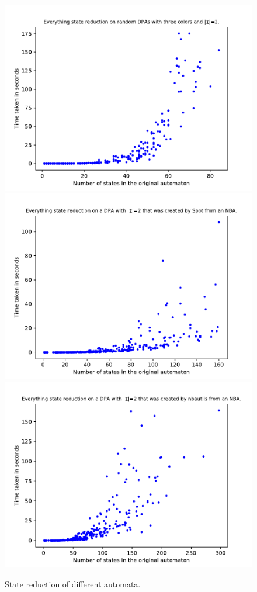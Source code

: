 \begin{figure}
\begin{minipage}{0.49\textwidth}
		\caption{State reduction of different automata.}
		\label{fig:everything:empirical_size_hist}
	\end{minipage}
	\hfill
	\begin{minipage}{0.49\textwidth}
		\includegraphics[page=3,height=.3\textheight]{../data/analysis/everything/gendet_ap1.pdf} 
		\includegraphics[page=3,height=.3\textheight]{../data/analysis/everything/detspot_ap1.pdf} 
		\includegraphics[page=3,height=.3\textheight]{../data/analysis/everything/detnbaut_ap1.pdf} 

\end{minipage}
\end{figure}
